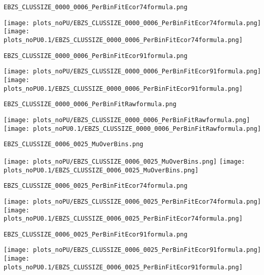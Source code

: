 \begin{frame}[fragile]
\begin{verbatim}
EBZS_CLUSSIZE_0000_0006_PerBinFitEcor74formula.png
\end{verbatim}
\texttt{[image: plots\_noPU/EBZS\_CLUSSIZE\_0000\_0006\_PerBinFitEcor74formula.png]}
\texttt{[image: plots\_noPU0.1/EBZS\_CLUSSIZE\_0000\_0006\_PerBinFitEcor74formula.png]}
\end{frame}
\begin{frame}[fragile]
\begin{verbatim}
EBZS_CLUSSIZE_0000_0006_PerBinFitEcor91formula.png
\end{verbatim}
\texttt{[image: plots\_noPU/EBZS\_CLUSSIZE\_0000\_0006\_PerBinFitEcor91formula.png]}
\texttt{[image: plots\_noPU0.1/EBZS\_CLUSSIZE\_0000\_0006\_PerBinFitEcor91formula.png]}
\end{frame}
\begin{frame}[fragile]
\begin{verbatim}
EBZS_CLUSSIZE_0000_0006_PerBinFitRawformula.png
\end{verbatim}
\texttt{[image: plots\_noPU/EBZS\_CLUSSIZE\_0000\_0006\_PerBinFitRawformula.png]}
\texttt{[image: plots\_noPU0.1/EBZS\_CLUSSIZE\_0000\_0006\_PerBinFitRawformula.png]}
\end{frame}
\begin{frame}[fragile]
\begin{verbatim}
EBZS_CLUSSIZE_0006_0025_MuOverBins.png
\end{verbatim}
\texttt{[image: plots\_noPU/EBZS\_CLUSSIZE\_0006\_0025\_MuOverBins.png]}
\texttt{[image: plots\_noPU0.1/EBZS\_CLUSSIZE\_0006\_0025\_MuOverBins.png]}
\end{frame}
\begin{frame}[fragile]
\begin{verbatim}
EBZS_CLUSSIZE_0006_0025_PerBinFitEcor74formula.png
\end{verbatim}
\texttt{[image: plots\_noPU/EBZS\_CLUSSIZE\_0006\_0025\_PerBinFitEcor74formula.png]}
\texttt{[image: plots\_noPU0.1/EBZS\_CLUSSIZE\_0006\_0025\_PerBinFitEcor74formula.png]}
\end{frame}
\begin{frame}[fragile]
\begin{verbatim}
EBZS_CLUSSIZE_0006_0025_PerBinFitEcor91formula.png
\end{verbatim}
\texttt{[image: plots\_noPU/EBZS\_CLUSSIZE\_0006\_0025\_PerBinFitEcor91formula.png]}
\texttt{[image: plots\_noPU0.1/EBZS\_CLUSSIZE\_0006\_0025\_PerBinFitEcor91formula.png]}
\end{frame}
